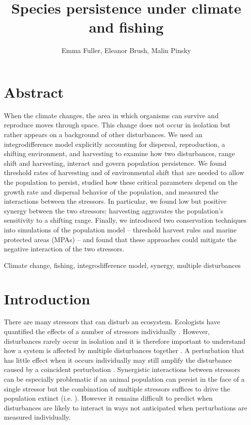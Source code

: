 \documentclass[12pt,english]{article}
\title{Species persistence under climate and fishing}
\author{Emma Fuller, Eleanor Brush, Malin Pinsky}
\date{}
\begin{document}
\maketitle

\begin{spacing}{1.9}
\begin{flushleft}

\section{Abstract}

When the climate changes, the area in which organisms can survive and reproduce moves through space. 
This change does not occur in isolation but rather appears on a background of other disturbances. We used an 
integrodifference model explicitly accounting for dispersal, reproduction, a shifting environment, and 
harvesting to examine how two disturbances, range shift and harvesting, interact and govern population 
persistence. We found threshold rates of harvesting and of environmental shift that are needed to allow the 
population to persist, studied how these critical parameters depend on the growth rate and dispersal behavior 
of the population, and measured the interactions between the stressors. In particular, we found low but positive 
synergy between the two stressors: harvesting aggravates the population's sensitivity to a shifting range. 
Finally, we introduced two conservation techniques into simulations of the population model -- threshold 
harvest rules and marine protected areas (MPAs) -- and found that 
these approaches could mitigate the negative interaction of the two stressors.  
\hspace{10cm}

 Climate change, fishing, integrodifference model, synergy, multiple disturbances

\section{Introduction}

There are many stressors that can disturb an ecosystem. Ecologists have quantified the effects of a number of stressors individually \citep{Wilcoveetal1998, Crainetal2008, DarlingCote2008}. However, disturbances rarely occur in isolation and it is therefore important to understand how a system is affected by multiple disturbances together \citep{DoakMorris2010, Fordhametal2013, Foltetal1999}. A perturbation that has little effect when it occurs individually may still amplify the disturbance caused by a coincident perturbation \citep{Crainetal2008, DarlingCote2008}. Synergistic interactions between stressors can be especially problematic if an animal population can persist in the face of a single stressor but the combination of multiple stressors suffices to drive the population extinct (i.e. \citet{Pelletieretal2006}). However it remains difficult to predict when disturbances are likely to interact in ways not anticipated when perturbations are measured individually.


\end{flushleft}
\end{spacing}
\end{document}
